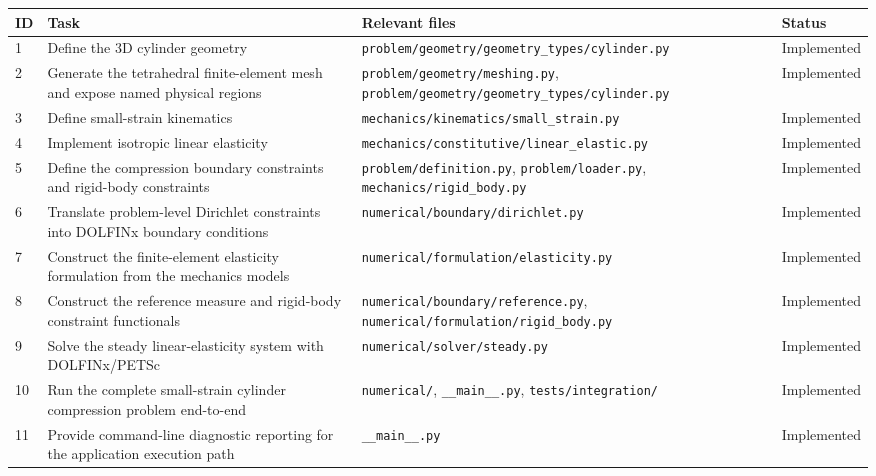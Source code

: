 \begin{longtable}{p{}p{}p{}p{}}
\toprule
\textbf{ID} & \textbf{Task} & \textbf{Relevant files} & \textbf{Status} \\
\midrule
\endhead

1 &
Define the 3D cylinder geometry &
\texttt{problem/geometry/geometry\_types/cylinder.py} &
Implemented \\

2 &
Generate the tetrahedral finite-element mesh and expose named physical regions &
\texttt{problem/geometry/meshing.py},
\texttt{problem/geometry/geometry\_types/cylinder.py} &
Implemented \\

3 &
Define small-strain kinematics &
\texttt{mechanics/kinematics/small\_strain.py} &
Implemented \\

4 &
Implement isotropic linear elasticity &
\texttt{mechanics/constitutive/linear\_elastic.py} &
Implemented \\

5 &
Define the compression boundary constraints and rigid-body constraints &
\texttt{problem/definition.py},
\texttt{problem/loader.py},
\texttt{mechanics/rigid\_body.py} &
Implemented \\

6 &
Translate problem-level Dirichlet constraints into DOLFINx boundary conditions &
\texttt{numerical/boundary/dirichlet.py} &
Implemented \\

7 &
Construct the finite-element elasticity formulation from the mechanics models &
\texttt{numerical/formulation/elasticity.py} &
Implemented \\

8 &
Construct the reference measure and rigid-body constraint functionals &
\texttt{numerical/boundary/reference.py},
\texttt{numerical/formulation/rigid\_body.py} &
Implemented \\

9 &
Solve the steady linear-elasticity system with DOLFINx/PETSc &
\texttt{numerical/solver/steady.py} &
Implemented \\

10 &
Run the complete small-strain cylinder compression problem end-to-end &
\texttt{numerical/},
\texttt{\_\_main\_\_.py},
\texttt{tests/integration/} &
Implemented \\

11 &
Provide command-line diagnostic reporting for the application execution path &
\texttt{\_\_main\_\_.py} &
Implemented \\


\end{longtable}

